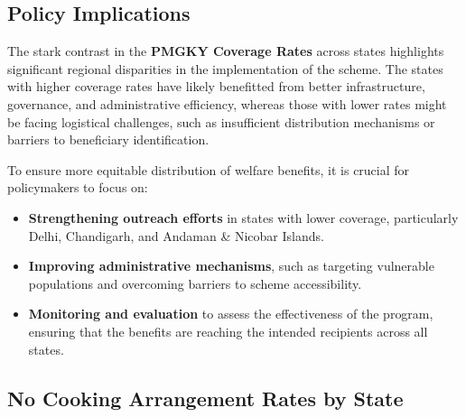 \documentclass{article}
\begin{document}
\subsection*{Policy Implications}
The stark contrast in the \textbf{PMGKY Coverage Rates} across states highlights significant regional disparities in the implementation of the scheme. The states with higher coverage rates have likely benefitted from better infrastructure, governance, and administrative efficiency, whereas those with lower rates might be facing logistical challenges, such as insufficient distribution mechanisms or barriers to beneficiary identification.

To ensure more equitable distribution of welfare benefits, it is crucial for policymakers to focus on:
\begin{itemize}
	\item \textbf{Strengthening outreach efforts} in states with lower coverage, particularly Delhi, Chandigarh, and Andaman \& Nicobar Islands.
	\item \textbf{Improving administrative mechanisms}, such as targeting vulnerable populations and overcoming barriers to scheme accessibility.
	\item \textbf{Monitoring and evaluation} to assess the effectiveness of the program, ensuring that the benefits are reaching the intended recipients across all states.
\end{itemize}




\subsection{ No Cooking Arrangement Rates by State}
\end{document}

